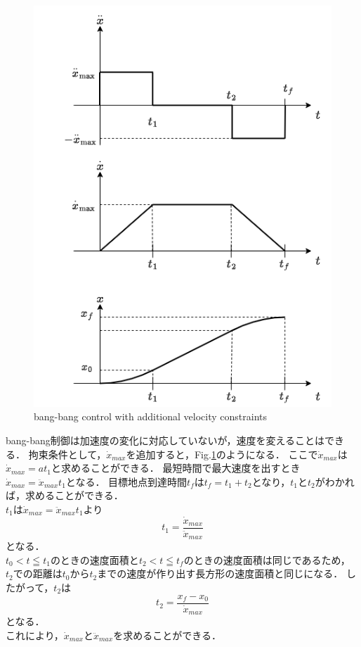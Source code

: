 \newpage
\begin{figure}[H]
     \centering
    \includegraphics[keepaspectratio, scale=0.8]
         {images/png/bangbangV.drawio.png}
    \caption{bang-bang control with additional velocity constraints}
    \label{Fig:bangbangV}
\end{figure}
\newpage

bang-bang制御は加速度の変化に対応していないが，速度を変えることはできる．
拘束条件として，$\dot{x}_{max}$を追加すると，Fig.\ref{Fig:bangbangV}のようになる．
ここで$\dot{x}_{max}$は$\dot{x}_{max}=at_1$と求めることができる．
最短時間で最大速度を出すとき$\dot{x}_{max}=\ddot{x}_{max}t_1$となる．
目標地点到達時間$t_f$は$t_f=t_1+t_2$となり，$t_1$と$t_2$がわかれば，求めることができる．\\
$t_1$は$\dot{x}_{max}=\ddot{x}_{max}t_1$より\\
\begin{equation} 
     t_1=\frac{\dot{x}_{max}}{\ddot{x}_{max}}
\end{equation}
となる．\\
$t_0 < t \leqq t_1$のときの速度面積と$t_2 < t \leqq t_f$のときの速度面積は同じであるため，
$t_2$での距離は$t_0$から$t_2$までの速度が作り出す長方形の速度面積と同じになる．
したがって，$t_2$は
\begin{equation} 
     t_2=\frac{x_f-x_0}{\dot{x}_{max}}
\end{equation}
となる．\\
これにより，$\dot{x}_{max}$と$\ddot{x}_{max}$を求めることができる．

\newpage
